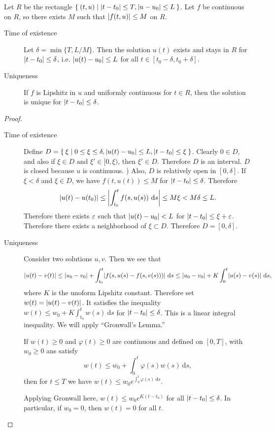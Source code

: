 \documentclass[10pt, twoside]{article}
\renewcommand{\d}{\ \mathrm{d}}
\begin{document}
    \begin{thm}
        Let $R$ be the rectangle $\Set{(t,u) | \lvert t-t_0\rvert \leq T, \lvert u-u_0\rvert \leq L}$. Let $f$ be continuous on $R$, so there exists $M$ such that $\lvert f(t,u)\rvert \leq M$ on $R$. 
        \begin{description}
            \item[Time of existence] Let $\delta = \min \{T,L/M\}$. Then the solution $u(t)$ exists and stays in $R$ for $\lvert t-t_0\rvert \leq \delta$, i.e. $\lvert u(t) - u_0\rvert \leq L$ for all $t \in [t_0-\delta, t_0+\delta]$.
            \item[Uniqueness] If $f$ is Lipshitz in $u$ and uniformly continuous for $t \in R$, then the solution is unique for $\lvert t-t_0\rvert \leq \delta$.
        \end{description}
        \begin{proof}
         \begin{description}
             \item[Time of existence] Define $D = \Set{\xi | 0 \leq \xi \leq \delta, \lvert u(t)-u_0\rvert \leq L, \lvert t-t_0\rvert \leq \xi}$. Clearly $0 \in D$, and also if $\xi \in D$ and $\xi' \in [0,\xi)$, then $\xi' \in D$. Therefore $D$ is an interval. $D$ is closed because $u$ is continuous. 
                 )
                 Also, $D$ is relatively open in $[0,\delta]$. If $\xi < \delta$ and $\xi \in D$, we have $f(t,u(t)) \leq M$ for $\lvert t-t_0\rvert \leq \delta$. Therefore \[ \abs{u(t) - u(t_0)} \leq \abs*{\int_{t_0}^t f(s,u(s)) \d s } \leq M \xi < M \delta \leq L. \] Therefore there exists $\varepsilon$ such that $\lvert u(t) - u_0\rvert < L$ for $\lvert t-t_0\rvert \leq \xi + \varepsilon$. Therefore there exists a neighborhood of $\xi \subset D$. Therefore $D = [0,\delta]$. 
             \item[Uniqueness] Consider two solutions $u,v$. Then we see that \[\abs{u(t) - v(t)} \leq \abs{u_0-v_0} + \int_{t_0}^t \abs{f(s,u(s) - f(s,v(s)))} \d s \leq \abs{u_0-v_0} + K \int_0^t \abs{u(s) - v(s)} \d s, \] where $K$ is the unoform Lipshitz constant. Therefore set $w(t) = \lvert u(t) - v(t)\rvert$. It satisfies the inequality $w(t) \leq w_0 + K \int_{t_0}^t w(s) \d s$ for $\lvert t-t_0\rvert \leq \delta$. This is a linear integral inequality. We will apply ``Gronwall's Lemma.''

                 \begin{lem}[Gronwall]
                     If $w(t) \geq 0$ and $\varphi(t) \geq 0$ are continuous and defined on $[0,T]$, with $w_0 \geq 0$ ans satisfy \[ w(t) \leq w_0 + \int_0^t \varphi(s)w(s) \d s, \] then for $t \leq T$ we have $w(t) \leq w_0 e^{\int_0^t \varphi(s)\d s}$.
                 \end{lem}

                 Applying Gronwall here, $w(t) \leq w_0e^{K(t-t_0)}$ for all $\lvert t-t_0\rvert \leq \delta$. In particular, if $w_0 = 0$, then $w(t) = 0$ for all $t$. \qedhere
        \end{description}           
        \end{proof}
    \end{thm}
\end{document}
